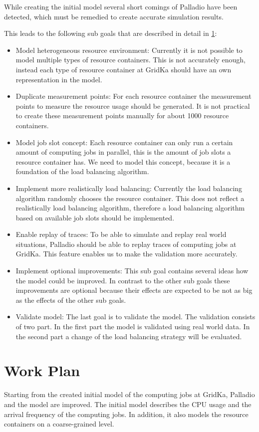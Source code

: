 While creating the initial model several short comings of Palladio have been detected, which must be remedied to create accurate simulation results. 

This leads to the following sub goals that are described in detail in \cref{plan}: 
\begin{itemize}
	\item Model heterogeneous resource environment: Currently it is not possible to model multiple types of resource containers. This is not accurately enough, instead each type of resource container at GridKa should have an own representation in the model.
	\item Duplicate measurement points: For each resource container the measurement points to measure the resource usage should be generated. It is not practical to create these measurement points manually for about 1000 resource containers.
	\item Model job slot concept: Each resource container can only run a certain amount of computing jobs in parallel, this is the amount of job slots a resource container has. We need to model this concept, because it is a foundation of the load balancing algorithm.
	\item Implement more realistically load balancing: Currently the load balancing algorithm randomly chooses the resource container. This does not reflect a realistically load balancing algorithm, therefore a load balancing algorithm based on available job slots should be implemented.
	\item Enable replay of traces: To be able to simulate and replay real world situations, Palladio should be able to replay traces of computing jobs at GridKa. This feature enables us to make the validation more accurately.
	\item Implement optional improvements: This sub goal contains several ideas how the model could be improved. In contrast to the other sub goals these improvements are optional because their effects are expected to be not as big as the effects of the other sub goals. 
	\item Validate model: The last goal is to validate the model. The validation consists of two part. In the first part the model is validated using real world data. In the second part a change of the load balancing strategy will be evaluated.
\end{itemize}


\chapter{Work Plan}
\label{plan}
Starting from the created initial model of the computing jobs at GridKa, Palladio and the model are improved.
The initial model describes the CPU usage and the arrival frequency of the computing jobs. In addition, it also models the resource containers on a coarse-grained level.

